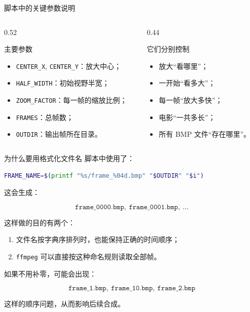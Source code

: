 \documentclass[aspectratio=169,11pt]{ctexbeamer}
\begin{document}
\begin{frame}{脚本中的关键参数说明}
\begin{columns}[T,onlytextwidth]

\begin{column}{0.52\textwidth}
\begin{block}{主要参数}
\begin{itemize}
  \item \texttt{CENTER\_X}, \texttt{CENTER\_Y}：放大中心；
  \item \texttt{HALF\_WIDTH}：初始视野半宽；
  \item \texttt{ZOOM\_FACTOR}：每一帧的缩放比例；
  \item \texttt{FRAMES}：总帧数；
  \item \texttt{OUTDIR}：输出帧所在目录。
\end{itemize}
\end{block}
\end{column}

\begin{column}{0.44\textwidth}
\begin{block}{它们分别控制}
\begin{itemize}
  \item 放大“看哪里”；
  \item 一开始“看多大”；
  \item 每一帧“放大多快”；
  \item 电影“一共多长”；
  \item 所有 BMP 文件“存在哪里”。
\end{itemize}
\end{block}
\end{column}

\end{columns}
\end{frame}

\begin{frame}[fragile]{为什么要用格式化文件名}
脚本中使用了：

\begin{lstlisting}[language=bash]
FRAME_NAME=$(printf "%s/frame_%04d.bmp" "$OUTDIR" "$i")
\end{lstlisting}

这会生成：

\[
\texttt{frame\_0000.bmp},\ \texttt{frame\_0001.bmp},\ \dots
\]

\vspace{0.5em}
这样做的目的有两个：

\begin{enumerate}
  \item 文件名按字典序排列时，也能保持正确的时间顺序；
  \item \texttt{ffmpeg} 可以直接按这种命名规则读取全部帧。
\end{enumerate}

\vspace{0.5em}
如果不用补零，可能会出现：

\[
\texttt{frame\_1.bmp},\ \texttt{frame\_10.bmp},\ \texttt{frame\_2.bmp}
\]

这样的顺序问题，从而影响后续合成。
\end{frame}
\end{document}
